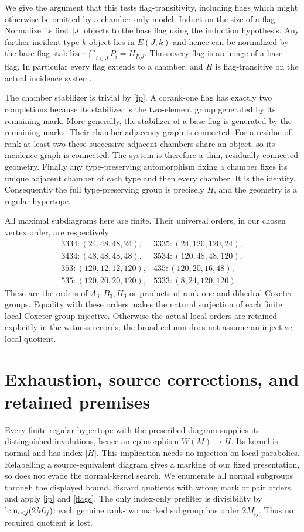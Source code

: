 \documentclass[11pt]{article}
\begin{document}
We give the argument that this tests flag-transitivity, including flags
which might otherwise be omitted by a chamber-only model. Induct on the
size of a flag. Normalize its first $|J|$ objects to the base flag using
the induction hypothesis. Any further incident type-$k$ object lies in
$E(J,k)$ and hence can be normalized by the base-flag stabilizer
$\bigcap_{i\in J}P_i=H_{I\setminus J}$. Thus every flag is an image of a
base flag. In particular every flag extends to a chamber, and $H$ is
flag-transitive on the actual incidence system.

The chamber stabilizer is trivial by \eqref{ip}. A corank-one flag has
exactly two completions because its stabilizer is the two-element group
generated by its remaining mark. More generally, the stabilizer of a
base flag is generated by the remaining marks. Their chamber-adjacency
graph is connected. For a residue of rank at least two these successive
adjacent chambers share an object, so its incidence graph is connected.
The system is therefore a thin, residually connected geometry. Finally
any type-preserving automorphism fixing a chamber fixes its unique
adjacent chamber of each type and then every chamber. It is the identity.
Consequently the full type-preserving group is precisely $H$, and the
geometry is a regular hypertope.

All maximal subdiagrams here are finite. Their universal orders, in our
chosen vertex order, are respectively
\[
\begin{array}{ll}
3334:(24,48,48,24),&3335:(24,120,120,24),\\
3434:(48,48,48,48),&3534:(120,48,48,120),\\
353:(120,12,12,120),&435:(120,20,16,48),\\
535:(120,20,20,120),&5333:(8,24,120,120).
\end{array}
\]
These are the orders of $A_3,B_3,H_3$ or products of rank-one and
dihedral Coxeter groups. Equality with these orders makes the natural
surjection of each finite local Coxeter group injective. Otherwise the
actual local orders are retained explicitly in the witness records;
the broad column does not assume an injective local quotient.

\section{Exhaustion, source corrections, and retained premises}
Every finite regular hypertope with the prescribed diagram supplies its
distinguished involutions, hence an epimorphism $W(M)\to H$. Its kernel is
normal and has index $|H|$. This implication needs no injection on local
parabolics. Relabelling a source-equivalent diagram gives a marking of
our fixed presentation, so does not evade the normal-kernel search.
We enumerate all normal subgroups through the displayed bound, discard
quotients with wrong mark or pair orders, and apply \eqref{ip} and
\eqref{flags}. The only index-only prefilter is divisibility by
$\mathop{\rm lcm}_{i<j}(2M_{ij})$: each genuine rank-two marked subgroup
has order $2M_{ij}$. Thus no required quotient is lost.
\end{document}
